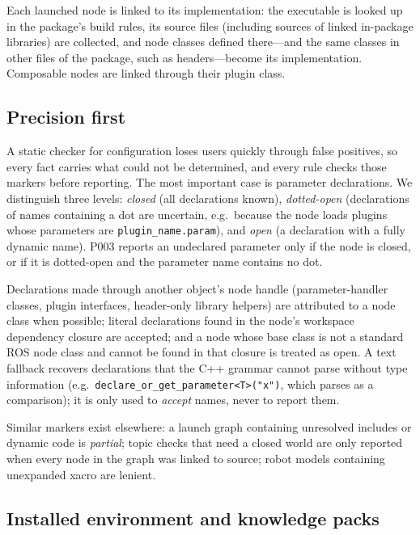 ﻿\documentclass[conference]{IEEEtran}
\newcommand{\code}[1]{\texttt{#1}}
\begin{document}
Each launched node is linked to its implementation: the executable is looked up in the
package's build rules, its source files (including sources of linked in-package libraries) are
collected, and node classes defined there---and the same classes in other files of the package,
such as headers---become its implementation. Composable nodes are linked through their plugin
class.

\subsection{Precision first}
\label{sec:precision}

A static checker for configuration loses users quickly through false positives, so every fact
carries what could not be determined, and every rule checks those markers before reporting.
The most important case is parameter declarations. We distinguish three levels:
\emph{closed} (all declarations known), \emph{dotted-open} (declarations of names containing
a dot are uncertain, e.g.\ because the node loads plugins whose parameters are
\code{plugin\_name.param}), and \emph{open} (a declaration with a fully dynamic name). P003
reports an undeclared parameter only if the node is closed, or if it is dotted-open and the
parameter name contains no dot.

Declarations made through another object's node handle (parameter-handler classes, plugin
interfaces, header-only library helpers) are attributed to a node class when possible; literal
declarations found in the node's workspace dependency closure are accepted; and a node whose
base class is not a standard ROS node class and cannot be found in that closure is treated as
open. A text fallback recovers declarations that the C++ grammar cannot parse without type
information (e.g.\ \code{declare\_or\_get\_parameter<T>("x")}, which parses as a comparison);
it is only used to \emph{accept} names, never to report them.

Similar markers exist elsewhere: a launch graph containing unresolved includes or dynamic code
is \emph{partial}; topic checks that need a closed world are only reported when every node in
the graph was linked to source; robot models containing unexpanded xacro are lenient.

\subsection{Installed environment and knowledge packs}
\label{sec:installed}
\end{document}
